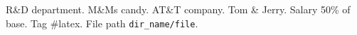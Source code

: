 \documentclass{article}
\begin{document}
R\&D department. M\&Ms candy. AT\&T company. Tom \& Jerry.
Salary 50\% of base. Tag \#latex. File path \texttt{dir\_name/file}.
\end{document}
